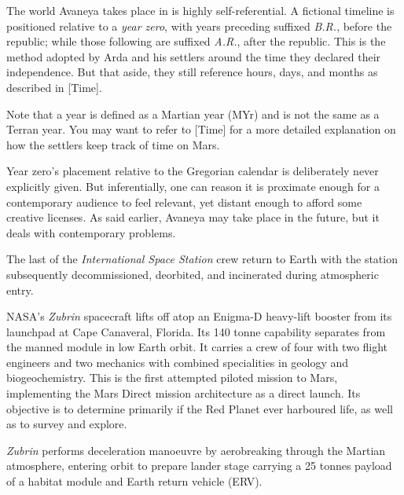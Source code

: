 
\startlines

The world Avaneya takes place in is highly self-referential. A fictional timeline is positioned relative to a {\it year zero}, with years preceding suffixed {\it B.R.}, before the republic; while those following are suffixed {\it A.R.}, after the republic. This is the method adopted by Arda and his settlers around the time they declared their independence. But that aside, they still reference hours, days, and months as described in [Time].

Note that a year is defined as a Martian year (MYr) and is not the same as a Terran year. You may want to refer to [Time] for a more detailed explanation on how the settlers keep track of time on Mars.

Year zero's placement relative to the Gregorian calendar is deliberately never explicitly given. But inferentially, one can reason it is proximate enough for a contemporary audience to feel relevant, yet distant enough to afford some creative licenses. As said earlier, Avaneya may take place in the future, but it deals with contemporary problems.
\crlf

The last of the {\it International Space Station} crew return to Earth with the station subsequently decommissioned, deorbited, and incinerated during atmospheric entry.
\StopTimelineDate

NASA's {\it Zubrin} spacecraft lifts off atop an Enigma-D heavy-lift booster from its launchpad at Cape Canaveral, Florida. Its 140 tonne capability separates from the manned module in low Earth orbit. It carries a crew of four with two flight engineers and two mechanics with combined specialities in geology and biogeochemistry. This is the first attempted piloted mission to Mars, implementing the Mars Direct mission architecture as a direct launch. Its objective is to determine primarily if the Red Planet ever harboured life, as well as to survey and explore.
\StopTimelineDate

{\it Zubrin} performs deceleration manoeuvre by aerobreaking through the Martian atmosphere, entering orbit to prepare lander stage carrying a 25 tonnes payload of a habitat module and Earth return vehicle (ERV).
\StopTimelineDate

